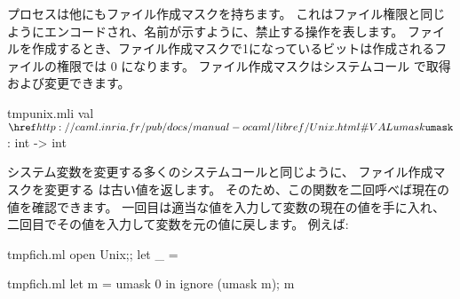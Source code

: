 プロセスは他にもファイル作成マスクを持ちます。
これはファイル権限と同じようにエンコードされ、名前が示すように、禁止する操作を表します。
ファイルを作成するとき、ファイル作成マスクで1になっているビットは作成されるファイルの権限では 0 になります。
ファイル作成マスクはシステムコール  で取得および変更できます。
%
\begin{listingcodefile}{tmpunix.mli}
val $\libvalue{Unix}{umask}$ : int -> int
\end{listingcodefile}
%
システム変数を変更する多くのシステムコールと同じように、
ファイル作成マスクを変更する  は古い値を返します。
そのため、この関数を二回呼べば現在の値を確認できます。
一回目は適当な値を入力して変数の現在の値を手に入れ、二回目でその値を入力して変数を元の値に戻します。
例えば:
%
\begin{codefile}{tmpfich.ml}
open Unix;;
let _ =
\end{codefile}
%
\begin{listingcodefile}{tmpfich.ml}
let m = umask 0 in ignore (umask m); m
\end{listingcodefile}

